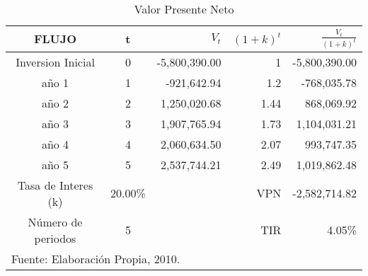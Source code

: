 \begin{table}
    \caption{Valor Presente Neto}
    \label{tbl:VPN}
    \centering
    \begin{tabular}{c|c|r|r|r}
        FLUJO               & t & $V_t$         & $\left(1+k\right)^t$ & $\frac{V_t}{\left(1+k\right)^t}$ \\
        \hline
        \hline
        Inversion Inicial   & 0 & -5,800,390.00 & 1                    &  -5,800,390.00                   \\
        \hline
        año 1               & 1 & -921,642.94   & 1.2                  &  -768,035.78                     \\
        año 2               & 2 & 1,250,020.68  & 1.44                 &  868,069.92                      \\
        año 3               & 3 & 1,907,765.94  & 1.73                 &  1,104,031.21                    \\
        año 4               & 4 & 2,060,634.50  & 2.07                 &  993,747.35                      \\
        año 5               & 5 & 2,537,744.21  & 2.49                 &  1,019,862.48                    \\
        \hline
        Tasa de Interes (k) &  20.00\% &        & VPN                  &  -2,582,714.82                   \\
        Número de periodos  & 5 &               & TIR                  &  4.05\%                          \\
        \hline
        \multicolumn{5}{l}{\footnotesize Fuente: Elaboración Propia, 2010.}
    \end{tabular}
\end{table}










